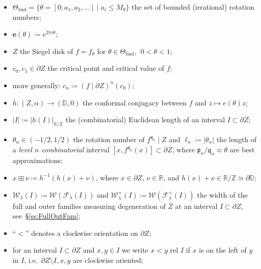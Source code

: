 \documentclass{amsart}
\renewcommand{\sp}{{\ \ }}
\newcommand{\1}{{\mathbb 1 }}
\newcommand{\Fam}{{\mathcal F}}
\newcommand{\Width}{{\mathcal W}}
\newcommand{\pp}{\mathfrak{p}}
\newcommand{\ee}{\mathbf e}
\newcommand{\qq}{\mathfrak{q}}
\newcommand{\R}{\mathbb{R}}
\newcommand{\Z}{\mathbb{Z}}
\newcommand{\Disk}{\mathbb{D}}
\theoremstyle{remark}
\numberwithin{equation}{section}
\theoremstyle{definition}
\newcommand{\bnd}{{\mathrm{bnd}}}
\begin{document}
 \begin{itemize}
 \item $\Theta_\bnd=\{\theta=[0;a_1,a_2,\dots] \mid a_i \le M_\theta\}$ the set of bounded (irrational) rotation numbers;
 
 \item $\ee(\theta)\coloneqq e^{2\pi i \theta}$;

\item $Z$ the Siegel disk of $f=f_\theta$ for $\theta\in \Theta_\bnd, \sp 0<\theta<1$;


\item $c_0, c_1\in  \partial Z$ the critical point and critical value of $f$; 

\item more generally: $c_n\coloneqq (f\mid \partial Z)^n (c_0)$;

 
\item $h\colon (Z,\alpha)\to (\Disk,0)$ the conformal conjugacy between $f$ and $z\mapsto e(\theta) z$;

\item $|I|\coloneqq |h(I)|_{\R/\Z}$ the (combinatorial) Euclidean length of an interval $I\subset \partial Z$;

\item $\theta_n\in (-1/2,1/2)$ the rotation number of $f^{\qq_n}\mid Z$ and $\ell_n\coloneqq |\theta_n|$ the length of a  \emph{level $n$ combinatorial} interval $[x,f^{\qq_n}(x)]\subset \partial Z$, where $\pp_n/\qq_n\approx \theta$ are best approximations;


\item $x \boxplus \nu \coloneqq h^{-1}(h(x)+\nu)$, where $x\in \partial Z$, $\nu\in \R$, and $h(x)+\nu \in \R/\Z\simeq \partial \Disk$;
  

\item $\Width_\lambda(I)\coloneqq \Width(\Fam_\lambda(I))$ and $\Width^+_\lambda(I)\coloneqq \Width(\Fam^+_\lambda(I))$ the width of the full and outer families measuring degeneration of $\overline Z$ at an interval $I\subset \partial Z$, see~\S\ref{ss:FullOutFam};

\item ``$<$'' denotes a clockwise orientation on $\partial Z$; 

\item for an interval $I\subset \partial Z$ and $x,y\in I$ we write $x<y$ rel $I$ if $x$ is on the left of $y$ in $I$, i.e.~$\partial Z\setminus I , x,y$ are clockwise oriented;


\end{itemize}
\end{document}
